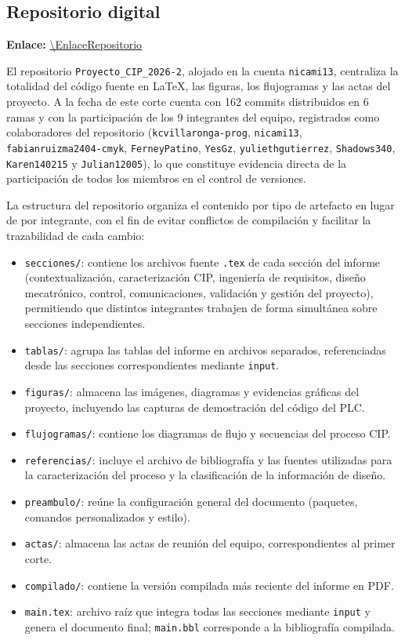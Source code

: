 {\subsection{Repositorio digital}
\textbf{Enlace:} \url{\EnlaceRepositorio}

El repositorio \texttt{Proyecto\_CIP\_2026-2}, alojado en la cuenta \texttt{nicami13}, centraliza la totalidad
del código fuente en \LaTeX{}, las figuras, los flujogramas y las actas del proyecto. A la fecha de este
corte cuenta con 162 commits distribuidos en 6 ramas y con la participación de los 9 integrantes del
equipo, registrados como colaboradores del repositorio (\texttt{kcvillaronga-prog}, \texttt{nicami13},
\texttt{fabianruizma2404-cmyk}, \texttt{FerneyPatino}, \texttt{YesGz}, \texttt{yuliethgutierrez},
\texttt{Shadows340}, \texttt{Karen140215} y \texttt{Julian12005}), lo que constituye evidencia directa
de la participación de todos los miembros en el control de versiones.

La estructura del repositorio organiza el contenido por tipo de artefacto en lugar de por integrante,
con el fin de evitar conflictos de compilación y facilitar la trazabilidad de cada cambio:

\begin{itemize}
    \item \texttt{secciones/}: contiene los archivos fuente \texttt{.tex} de cada sección del informe
    (contextualización, caracterización CIP, ingeniería de requisitos, diseño mecatrónico, control,
    comunicaciones, validación y gestión del proyecto), permitiendo que distintos integrantes trabajen
    de forma simultánea sobre secciones independientes.
    \item \texttt{tablas/}: agrupa las tablas del informe en archivos separados, referenciadas desde las
    secciones correspondientes mediante \texttt{input}.
    \item \texttt{figuras/}: almacena las imágenes, diagramas y evidencias gráficas del proyecto,
    incluyendo las capturas de demostración del código del PLC.
    \item \texttt{flujogramas/}: contiene los diagramas de flujo y secuencias del proceso CIP.
    \item \texttt{referencias/}: incluye el archivo de bibliografía y las fuentes utilizadas para la
    caracterización del proceso y la clasificación de la información de diseño.
    \item \texttt{preambulo/}: reúne la configuración general del documento (paquetes, comandos
    personalizados y estilo).
    \item \texttt{actas/}: almacena las actas de reunión del equipo, correspondientes al primer corte.
    \item \texttt{compilado/}: contiene la versión compilada más reciente del informe en PDF.
    \item \texttt{main.tex}: archivo raíz que integra todas las secciones mediante \texttt{input} y
    genera el documento final; \texttt{main.bbl} corresponde a la bibliografía compilada.
\end{itemize}

}

